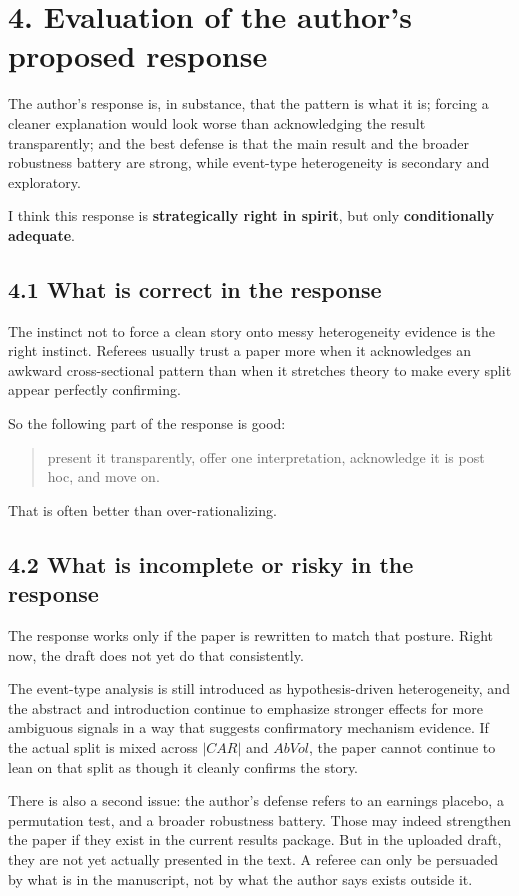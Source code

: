 \documentclass[11pt]{article}
\begin{document}
\section*{4. Evaluation of the author's proposed response}

The author's response is, in substance, that the pattern is what it is; forcing a cleaner explanation would look worse than acknowledging the result transparently; and the best defense is that the main result and the broader robustness battery are strong, while event-type heterogeneity is secondary and exploratory.

I think this response is \textbf{strategically right in spirit}, but only \textbf{conditionally adequate}.

\subsection*{4.1 What is correct in the response}

The instinct not to force a clean story onto messy heterogeneity evidence is the right instinct. Referees usually trust a paper more when it acknowledges an awkward cross-sectional pattern than when it stretches theory to make every split appear perfectly confirming.

So the following part of the response is good:
\begin{quote}
present it transparently, offer one interpretation, acknowledge it is post hoc, and move on.
\end{quote}

That is often better than over-rationalizing.

\subsection*{4.2 What is incomplete or risky in the response}

The response works only if the paper is rewritten to match that posture. Right now, the draft does not yet do that consistently.

The event-type analysis is still introduced as hypothesis-driven heterogeneity, and the abstract and introduction continue to emphasize stronger effects for more ambiguous signals in a way that suggests confirmatory mechanism evidence. If the actual split is mixed across $|CAR|$ and $AbVol$, the paper cannot continue to lean on that split as though it cleanly confirms the story.

There is also a second issue: the author's defense refers to an earnings placebo, a permutation test, and a broader robustness battery. Those may indeed strengthen the paper if they exist in the current results package. But in the uploaded draft, they are not yet actually presented in the text. A referee can only be persuaded by what is in the manuscript, not by what the author says exists outside it.
\end{document}
